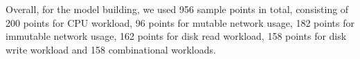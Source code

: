 Overall, for the model building, we used 956 sample points in total, consisting
of 200 points for CPU workload, 96 points for mutable network usage, 182 points
for immutable network usage, 162 points for disk read workload, 158 points for disk write 
workload and 158 combinational workloads.





